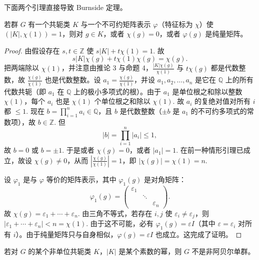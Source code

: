 下面两个引理直接导致 Burnside 定理。

\begin{lemma}\label{lem:19.6}
若群 \(G\) 有一个共轭类 \(K\) 与一个不可约矩阵表示 \(\varphi\)（特征标为 \(\chi\)）使 \((|K|, \chi(1)) = 1\)，则对 \(g \in K\)，或者 \(\chi(g) = 0\)，或者 \(\varphi(g)\) 是纯量矩阵。
\end{lemma}

\begin{proof}
由假设存在 \(s, t \in \mathbb{Z}\) 使 \(s|K|+t\chi(1) = 1\). 故
\[
s|K|\chi(g)+t\chi(1)\chi(g) = \chi(g).
\]
把两端除以 \(\chi(1)\)，并注意由推论 3 与命题 4，\(\frac{|K|\chi(g)}{\chi(1)}\) 与 \(t\chi(g)\) 都是代数整数，故 \(\frac{\chi(g)}{\chi(1)}\) 也是代数整数。设 \(a_1 = \frac{\chi(g)}{\chi(1)}\)，并设 \(a_1, a_2, \ldots, a_n\) 是它在 \(\mathbb{Q}\) 上的所有代数共轭（即 \(a_1\) 在 \(\mathbb{Q}\) 上的极小多项式的根）。由于 \(a_1\) 是单位根之和除以整数 \(\chi(1)\)，每个 \(a_i\) 也是 \(\chi(1)\) 个单位根之和除以 \(\chi(1)\). 故 \(a_i\) 的复绝对值对所有 \(i\) 都 \(\leq 1\). 现在 \(b = \prod_{i=1}^{n}a_i \in \mathbb{Q}\)，且 \(b\) 是代数整数（\(\pm b\) 是 \(a_1\) 的不可约多项式的常数项），故 \(b \in \mathbb{Z}\). 但
\[
|b| = \prod_{i=1}^{n}|a_i| \leq 1,
\]
故 \(b = 0\) 或 \(b = \pm1\). 于是或者 \(\chi(g) = 0\)，或者 \(|a_1| = 1\). 在前一种情形引理已成立，故设 \(\chi(g) \neq 0\)，从而 \(\left|\frac{\chi(g)}{\chi(1)}\right| = 1\)，即 \(|\chi(g)| = \chi(1) = n\).

设 \(\varphi_1\) 是与 \(\varphi\) 等价的矩阵表示，其中 \(\varphi_1(g)\) 是对角矩阵：
\[
\varphi_1(g) = \begin{pmatrix}\varepsilon_1 & & \\ & \ddots & \\ & & \varepsilon_n\end{pmatrix}.
\]
故 \(\chi(g) = \varepsilon_1+\cdots+\varepsilon_n\). 由三角不等式，若存在 \(i, j\) 使 \(\varepsilon_i \neq \varepsilon_j\)，则 \(|\varepsilon_1+\cdots+\varepsilon_n| < n = \chi(1)\). 由于这不可能，必有 \(\varphi_1(g) = \varepsilon I\)（其中 \(\varepsilon = \varepsilon_i\) 对所有 \(i\)）。由于纯量矩阵只与自身相似，\(\varphi(g) = \varepsilon I\) 也成立。这完成了证明。
\end{proof}

\begin{lemma}\label{lem:19.7}
若对 \(G\) 的某个非单位共轭类 \(K\)，\(|K|\) 是某个素数的幂，则 \(G\) 不是非阿贝尔单群。
\end{lemma}

